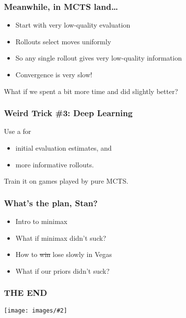 \documentclass[table]{beamer}
\newcommand\img[2]{\texttt{[image: images/\#2]}}
\begin{document}
\begin{frame}
	\frametitle{Meanwhile, in MCTS land\ldots}
	\begin{itemize}
		\item Start with very low-quality evaluation
		\item Rollouts select moves uniformly
		\item So any single rollout gives very low-quality information
		\item Convergence is very slow!
	\end{itemize}

	\vspace{5ex}

	What if we spent a bit more time and did slightly better?
\end{frame}

\begin{frame}
	\frametitle{Weird Trick \#3: Deep Learning}
	Use a \alert{}\footnotemark{} for
	
	\vspace{1.5ex}

	\begin{itemize}
		\setlength\itemsep{1.5ex}
		\item initial evaluation estimates, and
		\item more informative rollouts.
	\end{itemize}

	\vspace{1.5ex}

	Train it on games played by pure MCTS.

\end{frame}

\begin{frame}
	\frametitle{What's the plan, Stan?}
	\begin{itemize}
		\setlength\itemsep{5ex}
		\item Intro to minimax
		\item What if minimax didn't suck?
		\item How to \sout{win} lose slowly in Vegas
		\item What if our priors didn't suck?
	\end{itemize}
\end{frame}

\begin{frame}
	\frametitle{THE END}
	\begin{center}
		\img{0.8}{questions.jpg}
	\end{center}
\end{frame}
\end{document}
